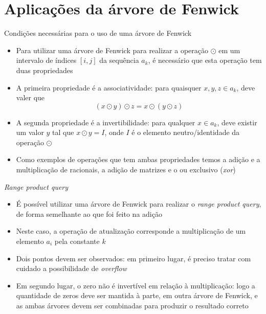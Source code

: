 \section{Aplicações da árvore de Fenwick}

\begin{frame}[fragile]{Condições necessárias para o uso de uma árvore de Fenwick}

    \begin{itemize}
        \item Para utilizar uma árvore de Fenwick para realizar a operação $\odot$ em um
            intervalo de índices $[i,j]$ da sequência $a_k$, é necessário que esta operação
            tem duas propriedades

        \item A primeira propriedade é a associatividade: para quaisquer $x, y, z \in a_k$,
            deve valer que
        \[
            (x \odot y)\odot z = x \odot (y \odot z)
        \]

        \item A segunda propriedade é a invertibilidade: para qualquer $x \in a_k$, deve existir
            um valor $y$ tal que $x\odot y = I$, onde $I$ é o elemento 
            neutro/identidade da operação $\odot$

        \item Como exemplos de operações que tem ambas propriedades temos a adição e a multiplicação
            de racionais, a adição de matrizes e o ou exclusivo (\textit{xor})
    \end{itemize}

\end{frame}

\begin{frame}[fragile]{{\it Range product query}}

    \begin{itemize}
        \item É possível utilizar uma árvore de Fenwick para realizar o \textit{range product
            query}, de forma semelhante ao que foi  feito na adição

        \item Neste caso, a operação de atualização corresponde a multiplicação de um elemento 
            $a_i$ pela constante $k$

        \item Dois pontos devem ser observados: em primeiro lugar, é preciso tratar com cuidado a 
            possibilidade de \textit{overflow} 

        \item Em segundo lugar, o zero não é invertível em relação à multiplicação: logo a
            quantidade de zeros deve ser mantida à parte, em outra árvore de Fenwick, e as
            ambas árvores devem ser combinadas para produzir o resultado correto
    \end{itemize}

\end{frame}

